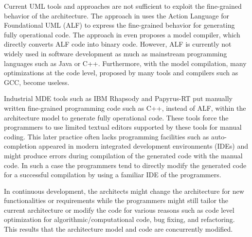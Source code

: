 


Current UML tools and approaches are not sufficient to exploit the fine-grained behavior of the architecture. 
The approach in \cite{ciccozzi2013towards} uses the Action Language for Foundational UML (ALF) \cite{alfspecification} to express the fine-grained behavior for generating fully operational code.
The approach in \cite{DBLP:conf/date/CharfiMGTB10} even proposes a model compiler, which directly converts ALF code into binary code.
However, ALF is currently not widely used in software development as much as mainstream programming languages such as Java or C++.
Furthermore, with the model compilation, many optimizations at the code level, proposed by many tools and compilers such as GCC, become useless.



Industrial MDE tools such as IBM Rhapsody \cite{ibm_rhapsody} and Papyrus-RT \cite{possepapyrusrt} put manually written fine-grained programming code such as C++, instead of ALF, within the architecture model to generate fully operational code. 
These tools force the programmers to use limited textual editors supported by these tools for manual coding. 
This later practice often lacks programming facilities such as auto-completion appeared in modern integrated development environments (IDEs) and might produce errors during compilation of the generated code with the manual code. 
In such a case the programmers tend to directly modify the generated code for a successful compilation by using a familiar IDE of the programmers. 


In continuous development, the architects might change the architecture for new functionalities or requirements while the programmers might still tailor the current architecture or modify the code for various reasons such as code level optimization for algorithmic/computational code, bug fixing, and refactoring. 
This results that the architecture model and code are concurrently modified. 


